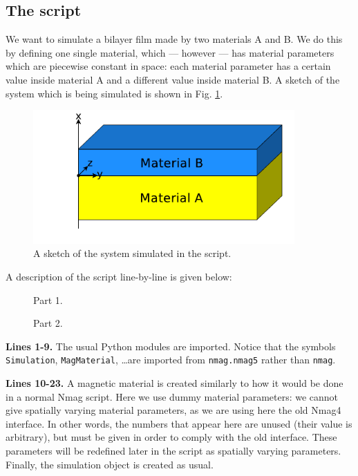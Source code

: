 \documentclass[11pt,oneside,openany]{article}
\begin{document}
\subsection{The script}
We want to simulate a bilayer film made by two materials A and B.
We do this by defining one single material, which --- however --- has
material parameters which are piecewise constant in space: each material
parameter has a certain value inside material A and a different value
inside material B. A sketch of the system which is being simulated is
shown in Fig. \ref{fig:sketch}.
\begin{figure}[t]
\begin{center}
\includegraphics[width=10.0cm]{sketch}
\caption[Sketch]{A sketch of the system simulated in the script.}
\label{fig:sketch}
\end{center}
\end{figure}

A description of the script line-by-line is given below:
\begin{figure}[!p]

\caption{Part 1.}
\end{figure}

\begin{figure}[!p]

\caption{Part 2.}
\end{figure}

\textbf{Lines 1-9.} The usual Python modules are imported.
Notice that the symbols \verb|Simulation|, \verb|MagMaterial|,
\ldots are imported from \verb|nmag.nmag5| rather than \verb|nmag|.

\textbf{Lines 10-23.} A magnetic material is created similarly to how
it would be done in a normal Nmag script. Here we use dummy material
parameters: we cannot give spatially varying material parameters, as
we are using here the old Nmag4 interface. In other words, the numbers
that appear here are unused (their value is arbitrary), but must be given
in order to comply with the old interface. These parameters will be
redefined later in the script as spatially varying parameters.
Finally, the simulation object is created as usual.
\end{document}
